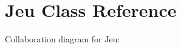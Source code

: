\hypertarget{classJeu}{}\section{Jeu Class Reference}
\label{classJeu}


Collaboration diagram for Jeu\+:
